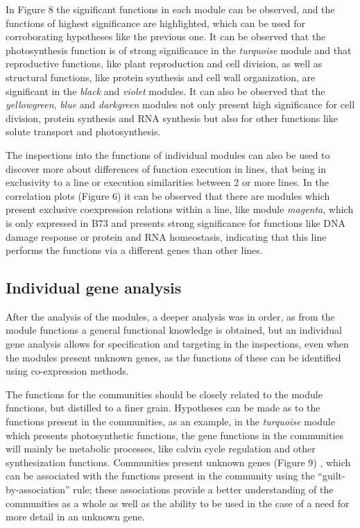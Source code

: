 \documentclass[
]{article}
\begin{document}
In Figure 8 the significant functions in each module can be observed,
and the functions of highest significance are highlighted, which can be
used for corroborating hypotheses like the previous one. It can be
observed that the photosynthesis function is of strong significance in
the \emph{turquoise} module and that reproductive functions, like plant
reproduction and cell division, as well as structural functions, like
protein synthesis and cell wall organization, are significant in the
\emph{black} and \emph{violet} modules. It can also be observed that the
\emph{yellowgreen}, \emph{blue} and \emph{darkgreen} modules not only
present high significance for cell division, protein synthesis and RNA
synthesis but also for other functions like solute transport and
photosynthesis.

The inspections into the functions of individual modules can also be
used to discover more about differences of function execution in lines,
that being in exclusivity to a line or execution similarities between 2
or more lines. In the correlation plots (Figure 6) it can be observed
that there are modules which present exclusive coexpression relations
within a line, like module \emph{magenta}, which is only expressed in
B73 and presents strong significance for functions like DNA damage
response or protein and RNA homeostasis, indicating that this line
performs the functions via a different genes than other lines.

\hypertarget{individual-gene-analysis}{%
\subsection{Individual gene analysis}\label{individual-gene-analysis}}

After the analysis of the modules, a deeper analysis was in order, as
from the module functions a general functional knowledge is obtained,
but an individual gene analysis allows for specification and targeting
in the inspections, even when the modules present unknown genes, as the
functions of these can be identified using co-expression methods.

The functions for the communities should be closely related to the
module functions, but distilled to a finer grain. Hypotheses can be made
as to the functions present in the communities, as an example, in the
\emph{turquoise} module which presents photosynthetic functions, the
gene functions in the communities will mainly be metabolic processes,
like calvin cycle regulation and other synthesization functions.
Communities present unknown genes (Figure 9) , which can be associated
with the functions present in the community using the
``guilt-by-association'' rule; these associations provide a better
understanding of the communities as a whole as well as the ability to be
used in the case of a need for more detail in an unknown gene.
\end{document}

